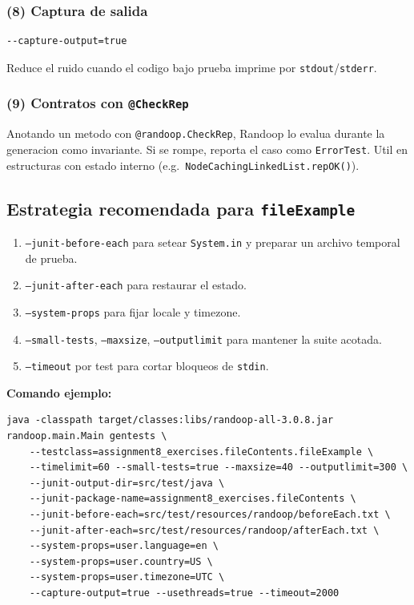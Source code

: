 \documentclass[12pt,a4paper]{article}
\begin{document}
\subsubsection*{(8) Captura de salida}

\begin{lstlisting}[style=codestyle]
--capture-output=true
\end{lstlisting}

Reduce el ruido cuando el codigo bajo prueba imprime por \texttt{stdout}/\texttt{stderr}.

\subsubsection*{(9) Contratos con \texttt{@CheckRep}}

Anotando un metodo con \texttt{@randoop.CheckRep}, Randoop lo evalua durante la generacion
como invariante. Si se rompe, reporta el caso como \texttt{ErrorTest}. Util en estructuras
con estado interno (e.g.\ \texttt{NodeCachingLinkedList.repOK()}).

\subsection{Estrategia recomendada para \texttt{fileExample}}

\begin{enumerate}
  \item \texttt{--junit-before-each} para setear \texttt{System.in} y preparar un archivo
  temporal de prueba.
  \item \texttt{--junit-after-each} para restaurar el estado.
  \item \texttt{--system-props} para fijar locale y timezone.
  \item \texttt{--small-tests}, \texttt{--maxsize}, \texttt{--outputlimit} para mantener la
  suite acotada.
  \item \texttt{--timeout} por test para cortar bloqueos de \texttt{stdin}.
\end{enumerate}

\textbf{Comando ejemplo:}

\begin{lstlisting}[style=codestyle]
java -classpath target/classes:libs/randoop-all-3.0.8.jar randoop.main.Main gentests \
    --testclass=assignment8_exercises.fileContents.fileExample \
    --timelimit=60 --small-tests=true --maxsize=40 --outputlimit=300 \
    --junit-output-dir=src/test/java \
    --junit-package-name=assignment8_exercises.fileContents \
    --junit-before-each=src/test/resources/randoop/beforeEach.txt \
    --junit-after-each=src/test/resources/randoop/afterEach.txt \
    --system-props=user.language=en \
    --system-props=user.country=US \
    --system-props=user.timezone=UTC \
    --capture-output=true --usethreads=true --timeout=2000
\end{lstlisting}
\end{document}

